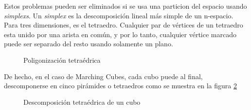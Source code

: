 Estos problemas pueden ser eliminados si se usa una particion del espacio usando \emph{simplexs}\cite{Bloomenthal88polygonizationof}.
Un \emph{simplex} es la descomposición lineal más simple de un n-espacio. Para tres dimensiones, es el tetraedro. Cualquier par de vértices de un tetraedro esta unido por una arista en común, y por lo tanto, cualquier vértice marcado puede ser separado del resto usando solamente un plano.




\begin{figure}[htb]
\centering
\caption{Poligonización tetraédrica}
\label{f:estadoDelArte:image_004}
\end{figure}

De hecho, en el caso de Marching Cubes, cada cubo puede al final, descomponerse en
cinco pirámides o tetraedros como se muestra en la figura \ref{f:estadoDelArte:image_006}

\begin{figure}[htb]
\centering
\caption{Descomposición tetraédrica de un cubo}
\label{f:estadoDelArte:image_006}
\end{figure}
